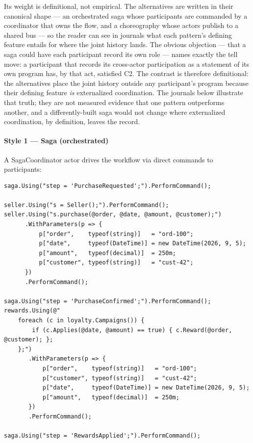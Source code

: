 \documentclass[
]{article}
\begin{document}
Its weight is definitional, not empirical. The alternatives are written
in their canonical shape --- an orchestrated saga whose participants are
commanded by a coordinator that owns the flow, and a choreography whose
actors publish to a shared bus --- so the reader can see in journals
what each pattern's defining feature entails for where the joint history
lands. The obvious objection --- that a saga could have each participant
record its own role --- names exactly the tell move: a participant that
records its cross-actor participation as a statement of its own program
has, by that act, satisfied C2. The contrast is therefore definitional:
the alternatives place the joint history outside any participant's
program because their defining feature \emph{is} externalized
coordination. The journals below illustrate that truth; they are not
measured evidence that one pattern outperforms another, and a
differently-built saga would not change where externalized coordination,
by definition, leaves the record.

\paragraph{Style 1 --- Saga
(orchestrated)}\label{style-1-saga-orchestrated}

A SagaCoordinator actor drives the workflow via direct commands to
participants:

\begin{verbatim}
saga.Using("step = 'PurchaseRequested';").PerformCommand();

seller.Using("s = Seller();").PerformCommand();
seller.Using("s.purchase(@order, @date, @amount, @customer);")
      .WithParameters(p => {
          p["order",    typeof(string)]   = "ord-100";
          p["date",     typeof(DateTime)] = new DateTime(2026, 9, 5);
          p["amount",   typeof(decimal)]  = 250m;
          p["customer", typeof(string)]   = "cust-42";
      })
      .PerformCommand();

saga.Using("step = 'PurchaseConfirmed';").PerformCommand();
rewards.Using(@"
    foreach (c in loyalty.Campaigns()) {
        if (c.Applies(@date, @amount) == true) { c.Reward(@order, @customer); };
    };")
       .WithParameters(p => {
           p["order",    typeof(string)]   = "ord-100";
           p["customer", typeof(string)]   = "cust-42";
           p["date",     typeof(DateTime)] = new DateTime(2026, 9, 5);
           p["amount",   typeof(decimal)]  = 250m;
       })
       .PerformCommand();

saga.Using("step = 'RewardsApplied';").PerformCommand();
\end{verbatim}
\end{document}
